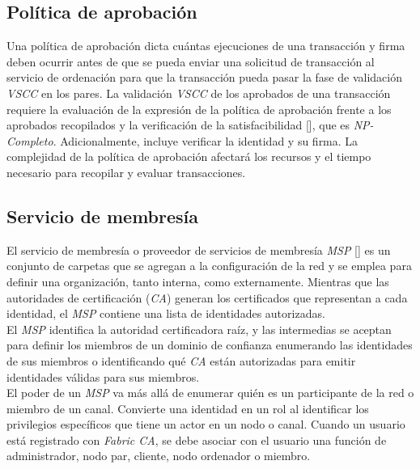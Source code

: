 \subsection{Pol\'itica de aprobaci\'on}
Una pol\'itica de aprobaci\'on dicta cu\'antas ejecuciones de una transacci\'on y firma deben ocurrir antes de que se pueda enviar una solicitud de transacci\'on al servicio de ordenaci\'on para que la transacci\'on pueda pasar la fase de validaci\'on \emph{VSCC} en los pares. La validaci\'on \emph{VSCC} de los aprobados de una transacci\'on requiere la evaluaci\'on de la expresi\'on de la pol\'itica de aprobaci\'on frente a los aprobados recopilados y la verificaci\'on de la satisfacibilidad [\cite{gottlieb2002evolutionary}], que es \emph{NP-Completo}. Adicionalmente, incluye verificar la identidad y su firma. La complejidad de la pol\'itica de aprobaci\'on afectar\'a los recursos y el tiempo necesario para recopilar y evaluar transacciones.

\subsection{Servicio de membres\'ia}
El servicio de membres\'ia o proveedor de servicios de membres\'ia \emph{MSP} [\cite{MSP}] es un conjunto de carpetas que se agregan a la configuraci\'on de la red y se emplea para definir una organizaci\'on, tanto interna, como externamente. Mientras que las autoridades de certificaci\'on (\emph{CA}) generan los certificados que representan a cada identidad, el \emph{MSP} contiene una lista de identidades autorizadas.\\

El \emph{MSP} identifica la autoridad certificadora ra\'iz, y las intermedias se aceptan para definir los miembros de un dominio de confianza enumerando las identidades de sus miembros o identificando qu\'e \emph{CA} est\'an autorizadas para emitir identidades v\'alidas para sus miembros.\\

El poder de un \emph{MSP} va m\'as all\'a de enumerar qui\'en es un participante de la red o miembro de un canal. Convierte una identidad en un rol al identificar los privilegios espec\'ificos que tiene un actor en un nodo o canal. Cuando un usuario est\'a registrado con \emph{Fabric CA}, se debe asociar con el usuario una funci\'on de administrador, nodo par, cliente, nodo ordenador o miembro.\\ 



